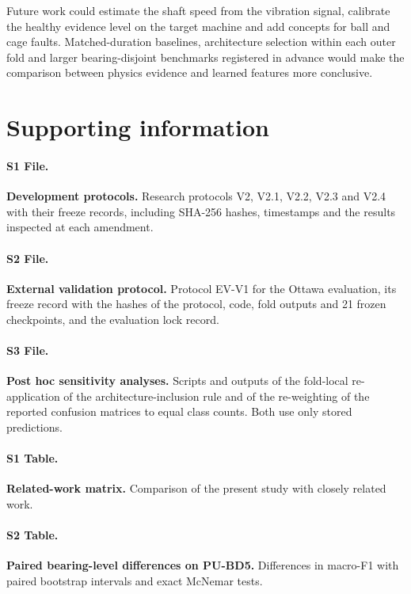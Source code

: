 \documentclass[10pt,letterpaper]{article}
\begin{document}
Future work could estimate the shaft speed from the vibration signal, calibrate the healthy evidence level on the target machine and add concepts for ball and cage faults. Matched-duration baselines, architecture selection within each outer fold and larger bearing-disjoint benchmarks registered in advance would make the comparison between physics evidence and learned features more conclusive.

\section*{Supporting information}

\paragraph*{S1 File.}
\label{S1_File}
\textbf{Development protocols.} Research protocols V2, V2.1, V2.2, V2.3 and V2.4 with their freeze records, including SHA-256 hashes, timestamps and the results inspected at each amendment.

\paragraph*{S2 File.}
\label{S2_File}
\textbf{External validation protocol.} Protocol EV-V1 for the Ottawa evaluation, its freeze record with the hashes of the protocol, code, fold outputs and 21 frozen checkpoints, and the evaluation lock record.

\paragraph*{S3 File.}
\label{S3_File}
\textbf{Post hoc sensitivity analyses.} Scripts and outputs of the fold-local re-application of the architecture-inclusion rule and of the re-weighting of the reported confusion matrices to equal class counts. Both use only stored predictions.

\paragraph*{S1 Table.}
\label{S1_Table}
\textbf{Related-work matrix.} Comparison of the present study with closely related work.

\paragraph*{S2 Table.}
\label{S2_Table}
\textbf{Paired bearing-level differences on PU-BD5.} Differences in macro-F1 with paired bootstrap intervals and exact McNemar tests.
\end{document}
